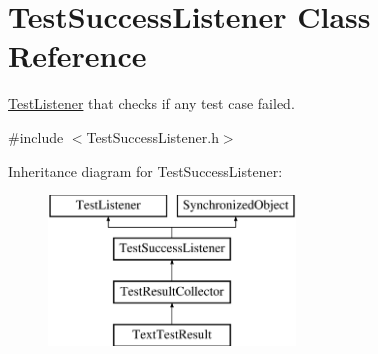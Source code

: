\hypertarget{class_test_success_listener}{\section{Test\-Success\-Listener Class Reference}
\label{class_test_success_listener}
}


\hyperlink{class_test_listener}{Test\-Listener} that checks if any test case failed.  




{\ttfamily \#include $<$Test\-Success\-Listener.\-h$>$}

Inheritance diagram for Test\-Success\-Listener\-:\begin{figure}[H]
\begin{center}
\leavevmode
\includegraphics[height=4.000000cm]{class_test_success_listener}
\end{center}
\end{figure}
